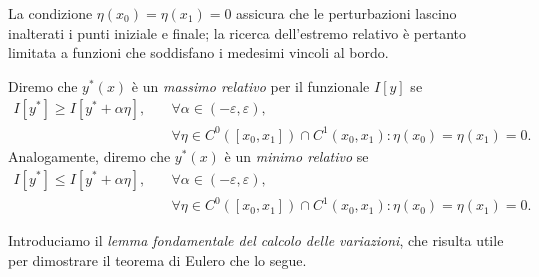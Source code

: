 La condizione $\eta(x_0)=\eta(x_1)=0$ assicura che le perturbazioni lascino inalterati i punti iniziale e finale; la ricerca dell'estremo relativo è pertanto limitata a funzioni che soddisfano i medesimi vincoli al bordo.

\begin{definition}
        Diremo che $y^*(x)$ è un \emph{massimo relativo} per il funzionale $I[y]$ se
        \begin{align*}
            I[y^*] \geq I[y^* + \alpha \eta], \quad
            &\forall \alpha \in (-\varepsilon, \varepsilon), \\
            &\forall \eta \in C^0([x_0, x_1])\cap C^1(x_0, x_1): \eta(x_0) = \eta(x_1) = 0.
        \end{align*}
        Analogamente, diremo che $y^*(x)$ è un \emph{minimo relativo} se
        \begin{align*}
            I[y^*] \leq I[y^* + \alpha \eta], \quad 
            &\forall \alpha \in (-\varepsilon, \varepsilon), \\
            &\forall \eta \in C^0([x_0, x_1])\cap C^1(x_0, x_1): \eta(x_0) = \eta(x_1) = 0.
        \end{align*}
\end{definition}

Introduciamo il \emph{lemma fondamentale del calcolo delle variazioni}, che risulta utile per dimostrare il teorema di Eulero che lo segue.

